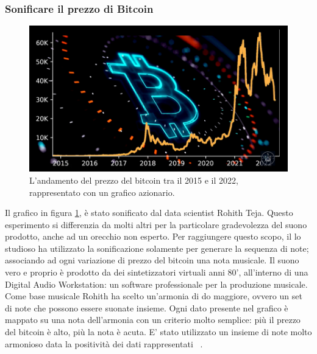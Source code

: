 \subsubsection{Sonificare il prezzo di Bitcoin}
\begin{figure}[H]
  \includegraphics[width=\linewidth]{img/btc.PNG}
  \caption{L'andamento del prezzo del bitcoin tra il 2015 e il 2022, rappresentato con un grafico azionario.}
  \label{fig:btc}
\end{figure}
Il grafico in figura \ref{fig:btc}, è stato sonificato dal data scientist Rohith Teja.
Questo esperimento si differenzia da molti altri per la particolare gradevolezza del suono prodotto, anche ad un orecchio non esperto.
Per raggiungere questo scopo, il lo studioso ha utilizzato la sonificazione solamente per generare la sequenza di note; associando ad ogni variazione di prezzo del bitcoin una nota musicale.
Il suono vero e proprio è prodotto da dei sintetizzatori virtuali anni 80', all'interno di una Digital Audio Workstation: un software professionale per la produzione musicale.
Come base musicale Rohith ha scelto un'armonia di do maggiore, ovvero un set di note che possono essere suonate insieme.
Ogni dato presente nel grafico è mappato su una nota dell'armonia con un criterio molto semplice: più il prezzo del bitcoin è alto, più la nota è acuta.
E' stato utilizzato un insieme di note molto armonioso data la positività dei dati rappresentati ~\cite{bitcoin}.
\\\\


